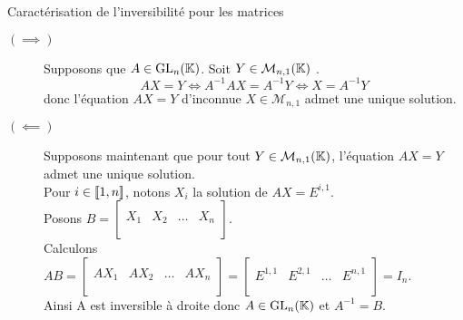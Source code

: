 \documentclass{article}
\begin{document}
\begin{question_kholle}
	[$A \in \mathcal{M}_n(\K)$ est inversible si et seulement si pour tout $Y \in \mathcal{M}_{n,1}(\K)$, l'équation $AX = Y$ d'inconnue $X \in \mathcal{M}_{n,1}$ admet une unique solution.]
	{Caractérisation de l'inversibilité pour les matrices}
	\hfill\\
	\begin{description}
		\item[$(\implies )$]
		      Supposons que $A \in \mathrm{GL}_n(\mathbb K)$.
		      Soit $Y \in \mathcal{M}_{n,1}(\K)$ \fq. \\
		      \[AX = Y \iff A^{-1}AX = A^{-1}Y \iff X = A^{-1}Y\]
		      donc l'équation $AX = Y$ d'inconnue $X \in \mathcal{M}_{n,1}$ admet une unique solution.

		\item[$(\impliedby)$] Supposons maintenant que pour tout $Y \in \mathcal{M}_{n,1}(\K)$, l’équation $AX = Y$ admet une unique solution.\\
		      Pour $i \in [\![ 1,n ]\!]$, notons  $X_i$ la solution de $AX = E^{i,1}$. \\
		      Posons $\displaystyle B = \left[ \begin{array}{c|c|c|c}
					          &     &        &     \\
					      X_1 & X_2 & \ldots & X_n \\
					          &     &        &     \\
				      \end{array} \right]$. \\
		      Calculons $\displaystyle AB
			      = \left[ \begin{array}{c|c|c|c}
					           &      &        &      \\
					      AX_1 & AX_2 & \ldots & AX_n \\
					           &      &        &      \\
				      \end{array} \right]
			      = \left[ \begin{array}{c|c|c|c}
					              &         &        &         \\
					      E^{1,1} & E^{2,1} & \ldots & E^{n,1} \\
					              &         &        &         \\
				      \end{array} \right]
			      = I_n$. \\
		      Ainsi A est inversible à droite donc $A \in \mathrm{GL}_n(\mathbb K)$ et $A^{-1} = B$.
	\end{description}
\end{question_kholle}
\end{document}
